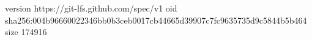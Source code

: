 version https://git-lfs.github.com/spec/v1
oid sha256:004b96660022346bb0b3ceb0017cb44665d39907c7fc9635735d9c5844b5b464
size 174916
